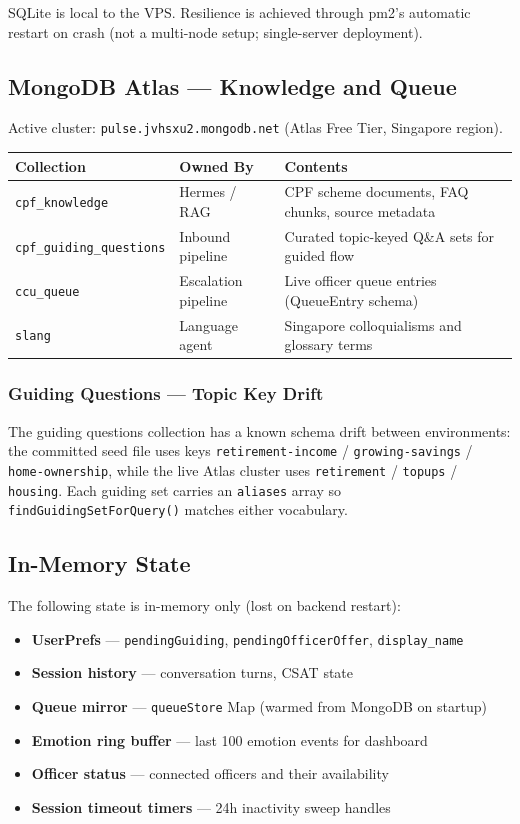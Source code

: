 \documentclass[12pt,a4paper]{article}
\begin{document}
SQLite is local to the VPS. Resilience is achieved through pm2's automatic restart
on crash (not a multi-node setup; single-server deployment).

\subsection{MongoDB Atlas — Knowledge and Queue}

Active cluster: \texttt{pulse.jvhsxu2.mongodb.net} (Atlas Free Tier, Singapore region).

\begin{tabular}{@{}llp{7cm}@{}}
\toprule
\textbf{Collection} & \textbf{Owned By} & \textbf{Contents} \\
\midrule
\texttt{cpf\_knowledge}         & Hermes / RAG        & CPF scheme documents, FAQ chunks, source metadata \\
\texttt{cpf\_guiding\_questions} & Inbound pipeline   & Curated topic-keyed Q\&A sets for guided flow \\
\texttt{ccu\_queue}             & Escalation pipeline & Live officer queue entries (QueueEntry schema) \\
\texttt{slang}                  & Language agent      & Singapore colloquialisms and glossary terms \\
\bottomrule
\end{tabular}

\subsubsection{Guiding Questions — Topic Key Drift}

The guiding questions collection has a known schema drift between environments:
the committed seed file uses keys \texttt{retirement-income} / \texttt{growing-savings} /
\texttt{home-ownership}, while the live Atlas cluster uses \texttt{retirement} / \texttt{topups} /
\texttt{housing}. Each guiding set carries an \texttt{aliases} array so \texttt{findGuidingSetForQuery()}
matches either vocabulary.

\subsection{In-Memory State}

The following state is in-memory only (lost on backend restart):
\begin{itemize}[noitemsep]
  \item \textbf{UserPrefs} — \texttt{pendingGuiding}, \texttt{pendingOfficerOffer}, \texttt{display\_name}
  \item \textbf{Session history} — conversation turns, CSAT state
  \item \textbf{Queue mirror} — \texttt{queueStore} Map (warmed from MongoDB on startup)
  \item \textbf{Emotion ring buffer} — last 100 emotion events for dashboard
  \item \textbf{Officer status} — connected officers and their availability
  \item \textbf{Session timeout timers} — 24h inactivity sweep handles
\end{itemize}
\end{document}
